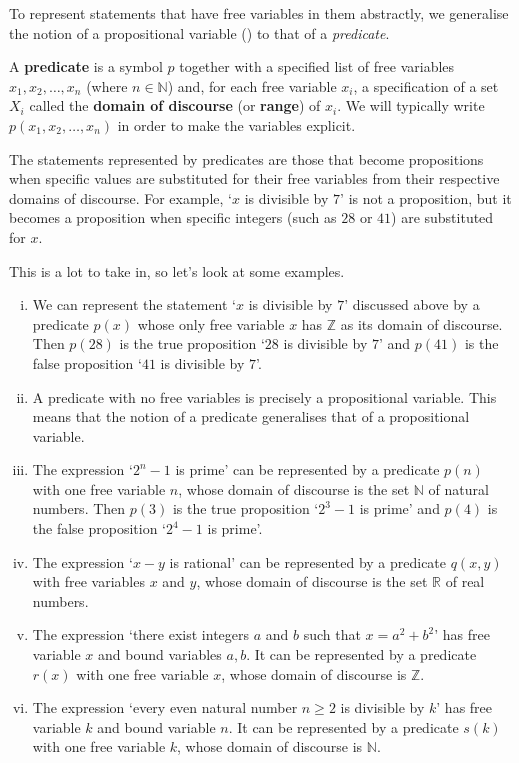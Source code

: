 To represent statements that have free variables in them abstractly, we generalise the notion of a propositional variable () to that of a \textit{predicate}.

\begin{definition}
\label{defPredicate}
A \textbf{predicate} is a symbol $p$ together with a specified list of free variables $x_1, x_2, \dots, x_n$ (where $n \in \mathbb{N}$) and, for each free variable $x_i$, a specification of a set $X_i$ called the \textbf{domain of discourse} (or \textbf{range}) of $x_i$. We will typically write $p(x_1,x_2,\dots,x_n)$ in order to make the variables explicit.
\end{definition}

The statements represented by predicates are those that become propositions when specific values are substituted for their free variables from their respective domains of discourse. For example, `$x$ is divisible by $7$' is not a proposition, but it becomes a proposition when specific integers (such as $28$ or $41$) are substituted for $x$.

This is a lot to take in, so let's look at some examples.

\begin{example}
\label{exFirstExamplesOfPredicates}
\fixlistskip
\begin{enumerate}[(i)]
\item We can represent the statement `$x$ is divisible by $7$' discussed above by a predicate $p(x)$ whose only free variable $x$ has $\mathbb{Z}$ as its domain of discourse. Then $p(28)$ is the true proposition `$28$ is divisible by $7$' and $p(41)$ is the false proposition `$41$ is divisible by $7$'.
\item A predicate with no free variables is precisely a propositional variable. This means that the notion of a predicate generalises that of a propositional variable.
\item The expression `$2^n-1$ is prime' can be represented by a predicate $p(n)$ with one free variable $n$, whose domain of discourse is the set $\mathbb{N}$ of natural numbers. Then $p(3)$ is the true proposition `$2^3-1$ is prime' and $p(4)$ is the false proposition `$2^4-1$ is prime'.
\item The expression `$x-y$ is rational' can be represented by a predicate $q(x,y)$ with free variables $x$ and $y$, whose domain of discourse is the set $\mathbb{R}$ of real numbers.
\item The expression `there exist integers $a$ and $b$ such that $x = a^2+b^2$' has free variable $x$ and bound variables $a,b$. It can be represented by a predicate $r(x)$ with one free variable $x$, whose domain of discourse is $\mathbb{Z}$.
\item The expression `every even natural number $n \ge 2$ is divisible by $k$' has free variable $k$ and bound variable $n$. It can be represented by a predicate $s(k)$ with one free variable $k$, whose domain of discourse is $\mathbb{N}$.
\end{enumerate}
\end{example}



